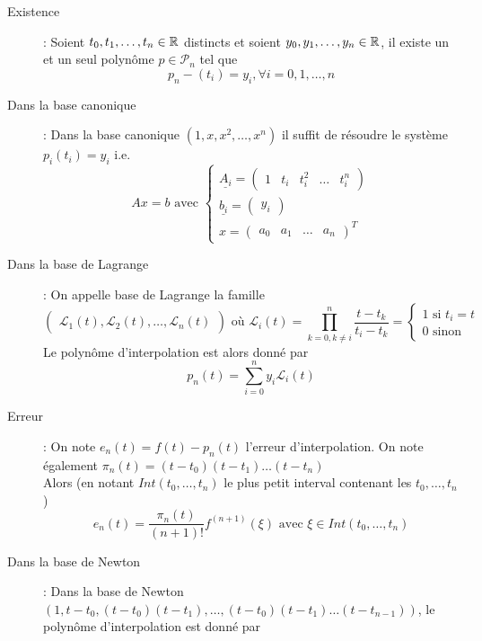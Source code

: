 \begin{description}
\item[Existence] : Soient $t_0,t_1,\dots,t_n\in\mathbb{R}$ distincts et soient $y_0,y_1,\dots,y_n\in\mathbb{R}$, il existe un et un seul polynôme $p\in\mathcal P_n$ tel que
    \[
        p_n-(t_i)=y_i, \forall i=0,1,\dots,n
    \]
\item[Dans la base canonique] : Dans la base canonique $(1,x,x^2,\dots,x^n)$ il suffit de résoudre le système $p_i(t_i)=y_i$ i.e.
    \[
        Ax=b\textrm{ avec }
        \begin{cases}
            \underline{A_i} = \begin{pmatrix}1 & t_i & t_i^2 & \dots & t_i^n\end{pmatrix}\\
            \underline{b_i} = \begin{pmatrix}y_i\end{pmatrix}\\
            x = \begin{pmatrix}a_0 & a_1 & \dots & a_n\end{pmatrix}^T
        \end{cases}
    \]
\item[Dans la base de Lagrange] : On appelle base de Lagrange la famille
    \[
        \begin{pmatrix}
            \mathcal L_1(t),
            \mathcal L_2(t),
            \dots,
            \mathcal L_n(t)
        \end{pmatrix}
        \textrm{ où }
        \mathcal L_i(t) = 
        \prod_{k=0, k\ne i}^n \dfrac{t-t_k}{t_i-t_k}
        =
        \begin{cases}
            1\textrm{ si }t_i=t\\
            0\textrm{ sinon}
        \end{cases}
    \]
    Le polynôme d'interpolation est alors donné par
    \[
        p_n(t)=\sum_{i=0}^ny_i\mathcal L_i(t)
    \]
\item[Erreur] : On note $e_n(t)=f(t)-p_n(t)$ l'erreur d'interpolation. On note également $\pi_n(t)=(t-t_0)(t-t_1)\dots (t-t_n)$\\
    Alors (en notant $Int(t_0,\dots,t_n)$ le plus petit interval contenant les $t_0,\dots,t_n$)
    \[
        e_n(t) = \dfrac{\pi_n(t)}{(n+1)!}f^{(n+1)}(\xi)\textrm{ avec }\xi\in Int(t_0,\dots,t_n)
    \]
\item[Dans la base de Newton] : Dans la base de Newton $(1,t-t_0,(t-t_0)(t-t_1),\dots,(t-t_0)(t-t_1)\dots(t-t_{n-1}))$, le polynôme d'interpolation est donné par

\end{description}
